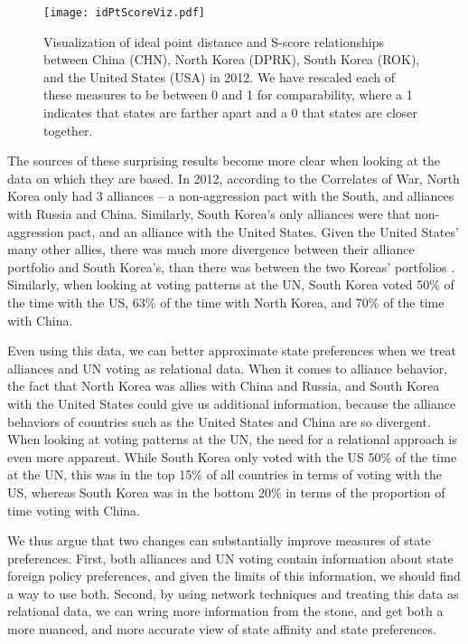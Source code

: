 \begin{figure}[ht]
	\texttt{[image: idPtScoreViz.pdf]}
	\caption{Visualization of ideal point distance and S-score relationships between China (CHN), North Korea (DPRK), South Korea (ROK), and the United States (USA) in 2012. We have rescaled each of these measures to be between 0 and 1 for comparability, where a 1 indicates that states are farther apart and a 0 that states are closer together.}
	\label{korean:prefs}
\end{figure}

The sources of these surprising results become more clear when looking at the data on which they are based. In 2012, according to the Correlates of War, North Korea only had 3 alliances -- a non-aggression pact with the South, and alliances with Russia and China. Similarly, South Korea's only alliances were that non-aggression pact, and an alliance with the United States. Given the United States' many other allies, there was much more divergence between their alliance portfolio and South Korea's, than there was between the two Koreas' portfolios \citep{gibler:sarkees:2004}. Similarly, when looking at voting patterns at the UN, South Korea voted 50\% of the time with the US, 63\% of the time with North Korea, and 70\% of the time with China.

Even using this data, we can better approximate state preferences when we treat alliances and UN voting as relational data. When it comes to alliance behavior, the fact that North Korea was allies with China and Russia, and South Korea with the United States could give us additional information, because the alliance behaviors of countries such as the United States and China are so divergent. When looking at voting patterns at the UN, the need for a relational approach is even more apparent. While South Korea only voted with the US 50\% of the time at the UN, this was in the top 15\% of all countries in terms of voting with the US, whereas South Korea was in the bottom 20\% in terms of the proportion of time voting with China.

We thus argue that two changes can substantially improve measures of state preferences. First, both alliances and UN voting contain information about state foreign policy preferences, and given the limits of this information, we should find a way to use both. Second, by using network techniques and treating this data as relational data, we can wring more information from the stone, and get both a more nuanced, and more accurate view of state affinity and state preferences.